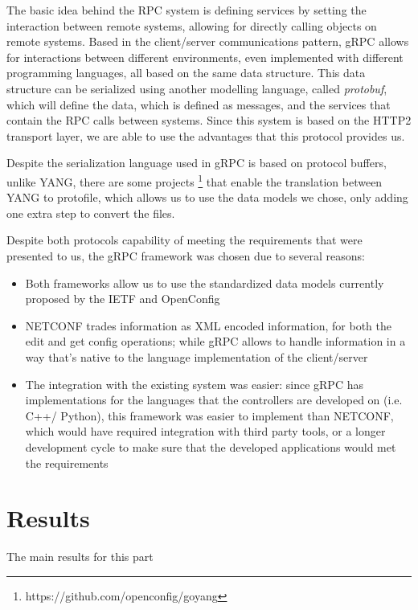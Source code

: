 The basic idea behind the RPC system is defining services by setting the interaction between remote systems, allowing for directly calling objects on remote systems. Based in the client/server communications 
pattern, gRPC allows for interactions between different environments, even implemented with different programming languages, all based on the same data structure. This data structure can be serialized using another modelling 
language, called \textit {protobuf}, which will define the data, which is defined as messages, and the services that contain the RPC calls between systems. Since this system is based on the HTTP2 transport layer, we are able to
use the advantages that this protocol provides us.
\par Despite the serialization language used in gRPC is based on protocol buffers, unlike YANG, there are some projects \footnote {https://github.com/openconfig/goyang} that enable the translation between YANG to protofile,
which allows us to use the data models we chose, only adding one extra step to convert the files.
\par Despite both protocols capability of meeting the requirements that were presented to us, the gRPC framework was chosen due to several reasons:

\begin {itemize}
    \item Both frameworks allow us to use the standardized data models currently proposed by the IETF and OpenConfig
    \item NETCONF trades information as XML encoded information, for both the edit and get config operations; while gRPC allows to handle information in a way that’s native to the language implementation of the client/server
    \item The integration with the existing system was easier: since gRPC has implementations for the languages that the controllers are developed on (i.e. C++/ Python), this framework was easier to implement 
        than NETCONF, which would have required integration with third party tools, or a longer development cycle to make sure that the developed applications would met the requirements
\end {itemize}

\section {Results}

The main results for this part 
